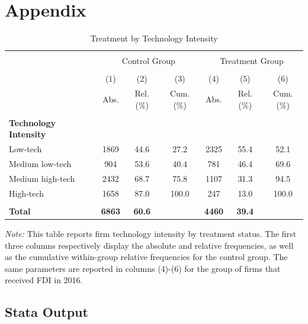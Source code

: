\documentclass[a4paper,11pt]{scrartcl}
\newcommand{\sectionnumbering}[1]{%
  \setcounter{section}{0}%
   \renewcommand{\thesection}{\csname #1\endcsname{section}}}
\begin{document}
\sectionnumbering{Roman}
\setcounter{page}{3} %

\appendix
\section{Appendix}
\setcounter{table}{0}

\begin{table}[htbp]
	\label{app:tech}
	\centering
	\caption{Treatment by Technology Intensity}
\begin{threeparttable}

\begin{tabular}{lcccccc} 
\hline
\hline \\[-0.8em]
 & \multicolumn{3}{c}{Control Group} & \multicolumn{3}{c}{Treatment Group} \\ \cline{2-7} \\[-0.8em]
 & (1) & (2) & (3) & (4) & (5) & (6) \\
 & Abs. & Rel.(\%) & Cum.(\%)  & Abs. & Rel.(\%) & Cum.(\%)\\
\hline \\[-0.8em]
\textbf{Technology Intensity} & & & & & \\
Low-tech &1869&44.6&27.2&2325&55.4&52.1 \\
Medium low-tech &904&53.6&40.4&781&46.4&69.6 \\
Medium high-tech &2432&68.7&75.8&1107&31.3&94.5 \\
High-tech &1658&87.0&100.0&247&13.0&100.0 \\ \\[-0.8em]
\textbf{Total}&\textbf{6863}&\textbf{60.6}&&\textbf{4460}&\textbf{39.4}& \\
\hline
\hline
\end{tabular}
\begin{tablenotes}[flushleft]
\footnotesize
\item\textit{Note:} This table reports firm technology intensity by treatment status. The first three columns respectively display the absolute and relative frequencies, as well as the cumulative within-group relative frequencies for the control group. The same parameters are reported in columns (4)-(6) for the group of firms that received FDI in 2016. 


\end{tablenotes}
\end{threeparttable}
\end{table}

\subsection{Stata Output}


\end{document}
